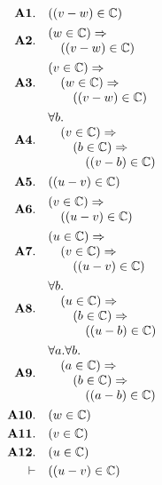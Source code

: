 \documentclass[11pt]{article}
\theoremstyle{plain}
\begin{document}
\begin{align*}
  \mathbf{A1.}\quad & ((v - w) \in \mathbb{C}) \\
  \mathbf{A2.}\quad & \begin{array}{@{}l@{}} (w \in \mathbb{C}) \Rightarrow  \\ \quad ((v - w) \in \mathbb{C}) \end{array} \\
  \mathbf{A3.}\quad & \begin{array}{@{}l@{}} (v \in \mathbb{C}) \Rightarrow  \\ \quad (w \in \mathbb{C}) \Rightarrow  \\ \quad \quad ((v - w) \in \mathbb{C}) \end{array} \\
  \mathbf{A4.}\quad & \begin{array}{@{}l@{}} \forall b. \\ \quad (v \in \mathbb{C}) \Rightarrow  \\ \quad \quad (b \in \mathbb{C}) \Rightarrow  \\ \quad \quad \quad ((v - b) \in \mathbb{C}) \end{array} \\
  \mathbf{A5.}\quad & ((u - v) \in \mathbb{C}) \\
  \mathbf{A6.}\quad & \begin{array}{@{}l@{}} (v \in \mathbb{C}) \Rightarrow  \\ \quad ((u - v) \in \mathbb{C}) \end{array} \\
  \mathbf{A7.}\quad & \begin{array}{@{}l@{}} (u \in \mathbb{C}) \Rightarrow  \\ \quad (v \in \mathbb{C}) \Rightarrow  \\ \quad \quad ((u - v) \in \mathbb{C}) \end{array} \\
  \mathbf{A8.}\quad & \begin{array}{@{}l@{}} \forall b. \\ \quad (u \in \mathbb{C}) \Rightarrow  \\ \quad \quad (b \in \mathbb{C}) \Rightarrow  \\ \quad \quad \quad ((u - b) \in \mathbb{C}) \end{array} \\
  \mathbf{A9.}\quad & \begin{array}{@{}l@{}} \forall a. \forall b. \\ \quad (a \in \mathbb{C}) \Rightarrow  \\ \quad \quad (b \in \mathbb{C}) \Rightarrow  \\ \quad \quad \quad ((a - b) \in \mathbb{C}) \end{array} \\
  \mathbf{A10.}\quad & (w \in \mathbb{C}) \\
  \mathbf{A11.}\quad & (v \in \mathbb{C}) \\
  \mathbf{A12.}\quad & (u \in \mathbb{C}) \\
  \vdash\quad & ((u - v) \in \mathbb{C})
\end{align*}
\end{document}
